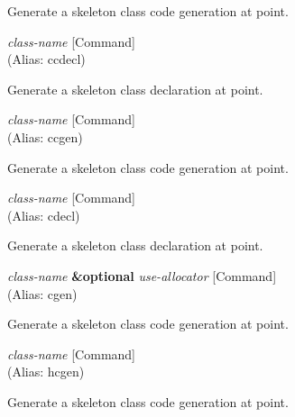 \begin{doc-string}
Generate a skeleton class code generation at point.
\end{doc-string}

\vspace{1em}
\noindent
{}
\usebox{\funcname}\emph{class-name}
 \hfill [Command]\\%
 (Alias: ccdecl)

\begin{doc-string}
Generate a skeleton class declaration at point.
\end{doc-string}

\vspace{1em}
\noindent
{}
\usebox{\funcname}\emph{class-name}
 \hfill [Command]\\%
 (Alias: ccgen)

\begin{doc-string}
Generate a skeleton class code generation at point.
\end{doc-string}

\vspace{1em}
\noindent
{}
\usebox{\funcname}\emph{class-name}
 \hfill [Command]\\%
 (Alias: cdecl)

\begin{doc-string}
Generate a skeleton class declaration at point.
\end{doc-string}

\vspace{1em}
\noindent
{}
\usebox{\funcname}\emph{class-name} \textbf{\&optional} \emph{use-allocator}
 \hfill [Command]\\%
 (Alias: cgen)

\begin{doc-string}
Generate a skeleton class code generation at point.
\end{doc-string}

\vspace{1em}
\noindent
{}
\usebox{\funcname}\emph{class-name}
 \hfill [Command]\\%
 (Alias: hcgen)

\begin{doc-string}
Generate a skeleton class code generation at point.
\end{doc-string}

